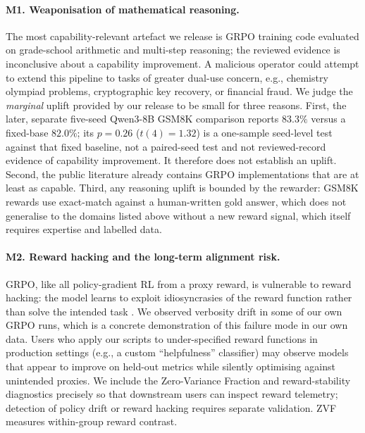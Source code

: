 \paragraph{M1. Weaponisation of mathematical reasoning.}
The most capability-relevant artefact we release is GRPO training code evaluated
on grade-school arithmetic and multi-step reasoning; the reviewed evidence is
inconclusive about a capability improvement. A malicious
operator could attempt to extend this pipeline to tasks of greater
dual-use concern, e.g., chemistry olympiad problems, cryptographic key
recovery, or financial fraud. We judge the \emph{marginal} uplift provided
by our release to be small for three reasons. First, the later, separate
five-seed Qwen3-8B GSM8K comparison reports $83.3\%$ versus a fixed-base
$82.0\%$; its $p{=}0.26$ ($t(4){=}1.32$) is a one-sample seed-level test against that fixed
baseline, not a paired-seed test and not reviewed-record evidence of capability
improvement. It therefore does not establish an uplift. Second, the public literature already contains GRPO implementations
\cite{shao2024deepseekmath, hu2024openrlhf, sheng2024verl, vonwerra2022trl} that are at
least as capable. Third, any reasoning uplift is bounded by the rewarder:
GSM8K rewards use exact-match against a human-written gold answer, which
does not generalise to the domains listed above without a new reward
signal, which itself requires expertise and labelled data.

\paragraph{M2. Reward hacking and the long-term alignment risk.}
GRPO, like all policy-gradient RL from a proxy reward, is vulnerable to
reward hacking: the model learns to exploit idiosyncrasies of the reward
function rather than solve the intended task \cite{skalse2022specificationgaming,
krakovna2020specification}. We observed verbosity drift in some
of our own GRPO runs, which is a concrete demonstration of this failure
mode in our own data.
Users who apply our scripts to under-specified reward functions in
production settings (e.g., a custom ``helpfulness'' classifier) may observe
models that appear to improve on held-out metrics while silently
optimising against unintended proxies. We include the Zero-Variance
Fraction and reward-stability diagnostics precisely so that downstream
users can inspect reward telemetry; detection of policy drift or reward hacking
requires separate validation. ZVF measures within-group reward contrast.

